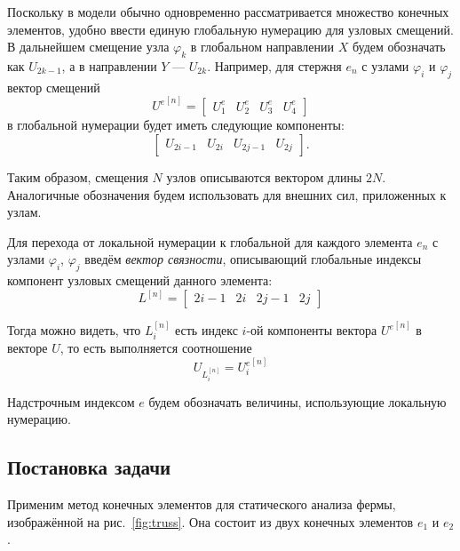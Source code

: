\documentclass[10pt]{article}
\numberwithin{equation}{section}
\renewcommand{\phi}{\varphi}
\newcommand{\neword}{\emph}
\newcommand{\figref}[1]{рис. \ref{#1}}
\newcommand{\node}[1]{$\phi_{#1}$}
\newcommand{\element}[1]{$e_{#1}$}
\begin{document}
Поскольку в модели обычно одновременно рассматривается множество
конечных элементов, удобно ввести единую глобальную нумерацию для
узловых смещений. В дальнейшем смещение узла \node{k} в глобальном
направлении $X$ будем обозначать как $U_{2k-1}$, а в направлении $Y$ —
$U_{2k}$. Например, для стержня \element{n} с узлами \node{i} и \node{j} вектор
смещений
\begin{equation*}
  {U^e}^{[n]}=
  \begin{bmatrix}
    U_1^e & U_2^e & U_3^e & U_4^e
  \end{bmatrix}
\end{equation*}
в глобальной нумерации будет иметь следующие компоненты:
\begin{equation}
  \label{eq:global-numbering}
  \begin{bmatrix}
    U_{2i-1} & U_{2i} & U_{2j-1} & U_{2j}
  \end{bmatrix}.
\end{equation}
 
Таким образом, смещения $N$ узлов описываются вектором длины $2N$.
Аналогичные обозначения будем использовать для внешних сил,
приложенных к узлам.

Для перехода от локальной нумерации к глобальной для каждого элемента
\element{n} с узлами \node{i}, \node{j} введём \neword{вектор
  связности}, описывающий глобальные индексы компонент узловых
смещений данного элемента:
\begin{equation}
  \label{eq:glob-num-vector}
  L^{[n]} =
  \begin{bmatrix}
    2i-1 & 2i & 2j-1 & 2j
  \end{bmatrix}
\end{equation}

Тогда можно видеть, что $L_i^{[n]}$ есть индекс $i$-ой компоненты
вектора ${U^e}^{[n]}$ в векторе $U$, то есть выполняется соотношение
\begin{equation}
  \label{eq:num-vector-transform}
  U_{L_i^{[n]}} = {U_i^e}^{[n]}
\end{equation}

Надстрочным индексом $e$ будем обозначать величины, использующие локальную
нумерацию.

\subsection{Постановка задачи}

Применим метод конечных элементов для статического анализа фермы,
изображённой на \figref{fig:truss}. Она состоит из двух конечных
элементов \element{1} и \element{2}.
\end{document}
